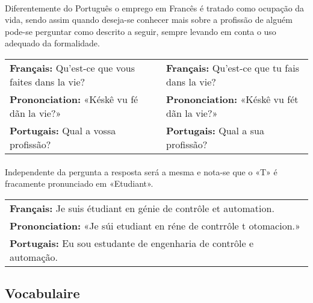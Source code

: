 \documentclass{article}
\begin{document}
        \paragraph{}Diferentemente do Português o emprego em Francês é tratado como ocupação da vida, sendo assim quando deseja-se conhecer mais sobre a profissão de alguém pode-se perguntar como descrito a seguir, sempre levando em conta o uso adequado da formalidade.
        
            \begin{center}
                \begin{tabular}{m{8cm} m{8cm}}
                    \textbf{Français:}      Qu’est-ce que vous faites dans la vie? & \textbf{Français:}      Qu’est-ce que tu fais dans la vie?\\
                    \textbf{Prononciation:} «Késkê vu fé dãn la vie?»              & \textbf{Prononciation:} «Késkê vu fét dãn la vie?»\\
                    \textbf{Portugais:}     Qual a vossa profissão?                & \textbf{Portugais:}     Qual a sua profissão?\\
                \end{tabular}
            \end{center}
        
        \paragraph{}Independente da pergunta a resposta será a mesma e nota-se que o «T» é fracamente pronunciado em «Etudiant».
        
            \begin{center}
                \begin{tabular}{l}
                    \textbf{Français:}      Je suis étudiant en génie de contrôle et automation.\\
                    \textbf{Prononciation:} «Je súi etudiant en réne de contrrôle t otomacion.»\\
                    \textbf{Portugais:}     Eu sou estudante de engenharia de contrôle e automação.\\ 
                \end{tabular}
            \end{center}
                
    \subsection{Vocabulaire}
\end{document}
